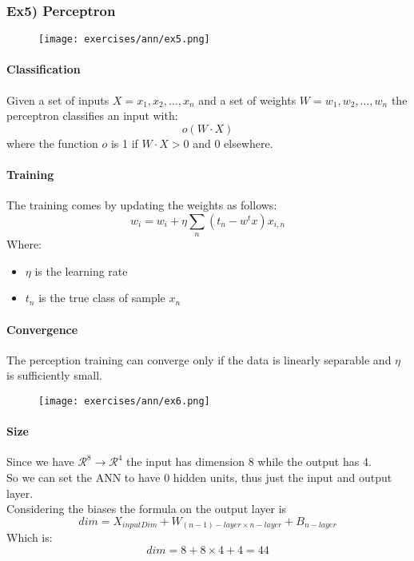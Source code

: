 \subsubsection{Ex5) Perceptron}

\begin{figure}[H]
    \centering
    \texttt{[image: exercises/ann/ex5.png]}
\end{figure}

\paragraph{Classification}
Given a set of inputs $X=x_1,x_2,\dots, x_n$ and a set of weights $W=w_1,w_2,\dots,w_n$ the perceptron classifies an input with:
$$o(W\cdot X)$$
where the function $o$ is 1 if $W\cdot X >0$ and 0 elsewhere.

\paragraph{Training}
The training comes by updating the weights as follows:
$$w_i=w_i+\eta \sum_n (t_n-w^tx)x_{i,n}$$
Where:
\begin{itemize}
\item $\eta$ is the learning rate
\item $t_n$ is the true class of sample $x_n$
\end{itemize}

\paragraph{Convergence}
The perception training can converge only if the data is linearly separable and $\eta$ is sufficiently small.



\begin{figure}[H]
    \centering
    \texttt{[image: exercises/ann/ex6.png]}
\end{figure}

\paragraph{Size}
Since we have $\mathcal{R}^8 \to \mathcal{R}^4$ the input has dimension 8 while the output has 4.\\
So we can set the ANN to have 0 hidden units, thus just the input and output layer.\\
Considering the biases the formula on the output layer is
$$dim=X_{inputDim}+W_{(n-1)-layer\times n-layer}+B_{n-layer}$$
Which is:
$$dim=8+8\times 4 +4=44$$

